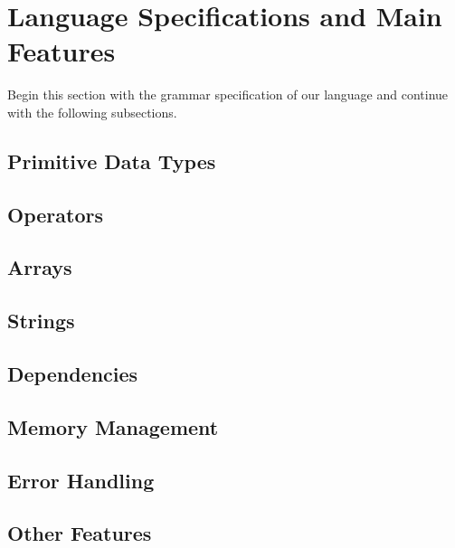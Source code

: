 \section{Language Specifications and Main Features}
\label{sect:spec}

Begin this section with the grammar specification of
our language and continue with the following subsections.
\subsection{Primitive Data Types}
\subsection{Operators}
\subsection{Arrays}
\subsection{Strings}
\subsection{Dependencies}
\subsection{Memory Management}
\subsection{Error Handling}
\subsection{Other Features}
\label{sect:core}
